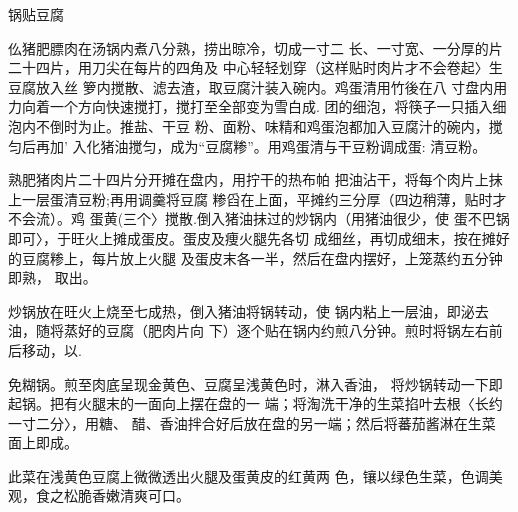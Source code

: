 \begin{recipe}{锅贴豆腐}

\ingredients



\cooking

仫猪肥膘肉在汤锅内煮八分熟，捞出晾冷，切成一寸二 长、一寸宽、一分厚的片二十四片，用刀尖在每片的四角及 中心轻轻划穿（这样贴时肉片才不会卷起〉生豆腐放入丝 箩内搅散、滤去渣，取豆腐汁装入碗内。鸡蛋清用竹後在八 寸盘内用力向着一个方向快速搅打，搅打至全部变为雪白成. 团的细泡，将筷子一只插入细泡内不倒时为止。推盐、干豆 粉、面粉、味精和鸡蛋泡都加入豆腐汁的碗内，搅匀后再加' 入化猪油搅匀，成为“豆腐糁”。用鸡蛋清与干豆粉调成蛋: 清豆粉。

\step 	熟肥猪肉片二十四片分开摊在盘内，用拧干的热布帕 把油沾干，将每个肉片上抹上一层蛋清豆粉;再用调羹将豆腐 糁舀在上面，平摊约三分厚（四边稍薄，贴时才不会流）。鸡 蛋黄(三个〉搅散.倒入猪油抹过的炒锅内（用猪油很少，使 蛋不巴锅即可〉，于旺火上摊成蛋皮。蛋皮及痩火腿先各切 成细丝，再切成细末，按在摊好的豆腐糁上，每片放上火腿 及蛋皮末各一半，然后在盘内摆好，上笼蒸约五分钟即熟， 取出。

\step 	炒锅放在旺火上烧至七成热，倒入猪油将锅转动，使 锅内粘上一层油，即泌去油，随将蒸好的豆腐（肥肉片向 下）逐个贴在锅内约煎八分钟。煎时将锅左右前后移动，以.

免糊锅。煎至肉底呈现金黄色、豆腐呈浅黄色时，淋入香油， 将炒锅转动一下即起锅。把有火腿末的一面向上摆在盘的一 端；将淘洗干净的生菜掐叶去根〈长约一寸二分〉，用糖、 醋、香油拌合好后放在盘的另一端；然后将蕃茄酱淋在生菜 面上即成。

\notes

此菜在浅黄色豆腐上微微透出火腿及蛋黄皮的红黄两 色，镶以绿色生菜，色调美观，食之松脆香嫩清爽可口。

\end{recipe}

